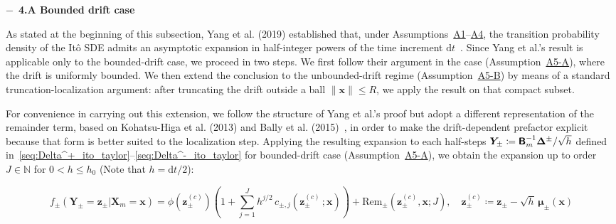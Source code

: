 \noindent$-$\ \textbf{4.A Bounded drift case} 

As stated at the beginning of this subsection, Yang et al. (2019) established that, under Assumptions~\hyperlink{assumption:A1}{A1}--\hyperlink{assumption:A4}{A4}, the transition probability density of the It\^{o} SDE admits an asymptotic expansion in half-integer powers of the time increment $\mathrm dt$~\cite{yang2019anew}.
Since Yang et al.'s result is applicable only to the bounded-drift case, we proceed in two steps. We first follow their argument in the case (Assumption~\hyperlink{assumption:A5-A}{A5-A}), where the drift is uniformly bounded. We then extend the conclusion to the unbounded-drift regime (Assumption~\hyperlink{assumption:A5-B}{A5-B}) by means of a standard truncation-localization argument: after truncating the drift outside a ball $\|\bm x\|\leq R$, we apply the result on that compact subset.

For convenience in carrying out this extension, we follow the structure of Yang et al.'s proof but adopt a different representation of the remainder term, based on Kohatsu-Higa et al. (2013) and Bally et al. (2015)~\cite{higa2013estimates,bally2015probabilistic}, in order to make the drift-dependent prefactor explicit because that form is better suited to the localization step.
Applying the resulting expansion to each half-steps $\bm Y_\pm \coloneqq \boldsymbol{\mathsf{B}}_m^{-1}\bm\Delta^\pm/\sqrt h$ defined in~\eqref{seq:Delta^+_ito_taylor}--\eqref{seq:Delta^-_ito_taylor} for bounded-drift case (Assumption~\hyperlink{assumption:A5-A}{A5-A}), we obtain the expansion up to order $J\in\mathbb N$ for $0<h\le h_0$ (Note that $h=\mathrm dt/2$):

\begin{equation}
    f_{\pm}(\bm Y_\pm=\bm z_{\pm}|\bm X_m=\bm x)=
    \phi\!\left(\bm z_\pm^{(c)}\right)
    \!\!\left(1+\sum_{j=1}^{J}h^{j/2}\,
    c_{\pm,j}\!\left(\bm z_{\pm}^{(c)}\,;\bm x\right)\right)
    +\mathrm{Rem}_\pm\!\!\left(\bm z_{\pm}^{(c)},\bm x;J\right),
    \quad
    \bm z_{\pm}^{(c)}\!\coloneq\bm z_{\pm}-\sqrt h\,\bm\mu_{\pm}(\bm x)
    \label{seq:f_pm_yang_expansion_original}
\end{equation}

